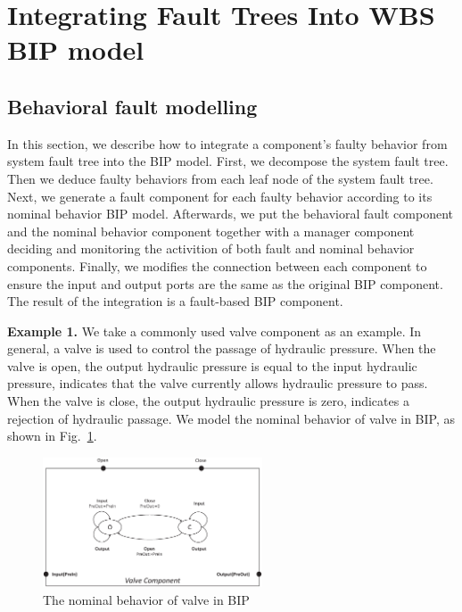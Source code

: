 

\section{Integrating Fault Trees Into WBS BIP model}

\subsection{Behavioral fault modelling}
In this section, we describe how to integrate a component's faulty behavior from system fault tree\cite{ft} into the BIP model. First, we decompose the system fault tree. Then we deduce faulty behaviors from each leaf node of the system fault tree. Next, we generate a fault component for each faulty behavior according to its nominal behavior BIP model. Afterwards, we put the behavioral fault component and the nominal behavior component together with a manager component deciding and monitoring the activition of both fault and nominal behavior components. Finally, we modifies the connection between each component to ensure the input and output ports are the same as the original BIP component. The result of the integration is a fault-based BIP component.


\textbf{Example 1.} We take a commonly used valve component as an example. In general, a valve is used to control the passage of hydraulic pressure. When the valve is open, the output hydraulic pressure is equal to the input hydraulic pressure, indicates that the valve currently allows hydraulic pressure to pass. When the valve is close, the output hydraulic pressure is zero, indicates a rejection of hydraulic passage. We model the nominal behavior of valve in BIP, as shown in Fig.~\ref{example_BIP_nominal}.

\begin{figure}[t]
	\centerline{\includegraphics[width=65mm]{figure/example_origin.eps}}
	\caption{The nominal behavior of valve in BIP}
	\label{example_BIP_nominal}
\end{figure}

